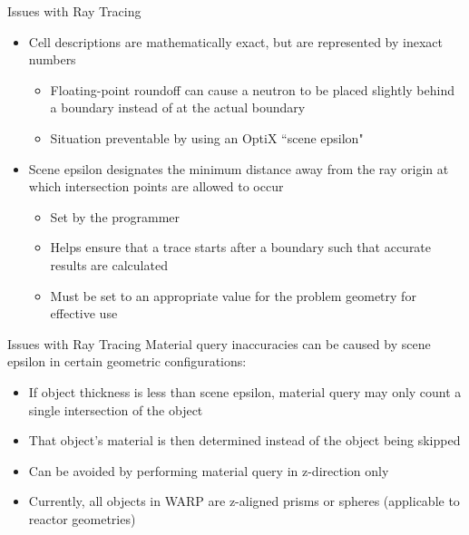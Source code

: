 \documentclass[xcolor=x11names, compress]{beamer}
\renewcommand{\(}{\begin{columns}}
\renewcommand{\)}{\end{columns}}
\newcommand{\<}[1]{\begin{column}{#1}}
\renewcommand{\>}{\end{column}}
\begin{document}
\begin{frame}{Issues with Ray Tracing \cite{warp}}
	\begin{itemize}
	\item{Cell descriptions are mathematically exact, but are represented by inexact numbers}
		\begin{itemize}
		\item{Floating-point roundoff can cause a neutron to be placed slightly behind a boundary
		instead of at the actual boundary}
		\item{Situation preventable by using an OptiX ``scene epsilon" }
		\end{itemize}
	\pause
	\vspace*{1 em}
	\item{Scene epsilon designates the minimum distance away from the ray origin at which 
	intersection points are allowed to occur}
		\begin{itemize}
		\item{Set by the programmer}
		\item{Helps ensure that a trace starts after a boundary such that accurate results are
		calculated}
		\item{Must be set to an appropriate value for the problem geometry for effective use}
		\end{itemize}
	\end{itemize}
\end{frame}


\begin{frame}{Issues with Ray Tracing \cite{warp}}
    Material query inaccuracies can be caused by scene epsilon in certain geometric 
	configurations:
		\begin{itemize}
		\item{If object thickness is less than scene epsilon, material query may only count a
		single intersection of the object}
		\vspace*{0.5 em}
		\item{That object's material is then determined instead of the object being skipped}
		\vspace*{0.5 em}
		\item{Can be avoided by performing material query in z-direction only}
		\vspace*{0.5 em}
		\item{Currently, all objects in WARP are z-aligned prisms or spheres 
		      (applicable to reactor geometries)}
		\end{itemize}
\end{frame}
\end{document}
